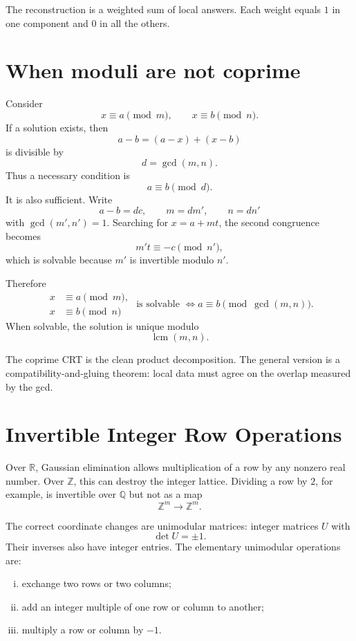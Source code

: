 The reconstruction is a weighted sum of local answers.  Each weight equals \(1\) in one component and \(0\) in all the others.

\section{When moduli are not coprime}

Consider
\[
  x\equiv a\pmod m,
  \qquad
  x\equiv b\pmod n.
\]
If a solution exists, then
\[
  a-b
  =(a-x)+(x-b)
\]
is divisible by
\[
  d=\gcd(m,n).
\]
Thus a necessary condition is
\[
  a\equiv b\pmod d.
\]
It is also sufficient.  Write
\[
  a-b=dc,
  \qquad
  m=dm',
  \qquad
  n=dn'
\]
with \(\gcd(m',n')=1\).  Searching for \(x=a+mt\), the second congruence becomes
\[
  m't\equiv-c\pmod{n'},
\]
which is solvable because \(m'\) is invertible modulo \(n'\).

Therefore
\[
  \boxed{
  \begin{aligned}
  x&\equiv a\pmod m,\\
  x&\equiv b\pmod n
  \end{aligned}
  \text{ is solvable }
  \Longleftrightarrow
  a\equiv b\pmod{\gcd(m,n)}.}
\]
When solvable, the solution is unique modulo
\[
  \operatorname{lcm}(m,n).
\]

The coprime CRT is the clean product decomposition.  The general version is a compatibility-and-gluing theorem: local data must agree on the overlap measured by the gcd.

\section{Invertible Integer Row Operations}

Over \(\mathbb R\), Gaussian elimination allows multiplication of a row by any nonzero real number.  Over \(\mathbb Z\), this can destroy the integer lattice.  Dividing a row by \(2\), for example, is invertible over \(\mathbb Q\) but not as a map
\[
  \mathbb Z^m\longrightarrow\mathbb Z^m.
\]

The correct coordinate changes are unimodular matrices: integer matrices \(U\) with
\[
  \det U=\pm1.
\]
Their inverses also have integer entries.  The elementary unimodular operations are:

\begin{enumerate}[(i)]
  \item exchange two rows or two columns;
  \item add an integer multiple of one row or column to another;
  \item multiply a row or column by \(-1\).
\end{enumerate}

